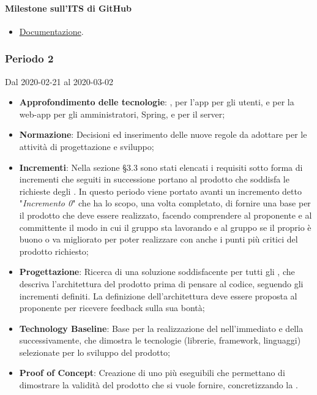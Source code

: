 \paragraph{Milestone sull'ITS di GitHub}
\begin{itemize}
	\item \href{https://github.com/qb-team/Stalker-Documentazione/milestone/8}{Documentazione}.
\end{itemize}

\subsubsection{Periodo 2} 
Dal 2020-02-21 al 2020-03-02
\begin{itemize}
	\item \textbf{Approfondimento delle tecnologie}: ,  per l'app per gli utenti,  e  per la web-app per gli amministratori, Spring,  e  per il server;
	\item \textbf{Normazione}: Decisioni ed inserimento delle nuove regole da adottare per le attività di progettazione e sviluppo;
	\item \textbf{Incrementi}: Nella sezione §3.3 sono stati elencati i requisiti sotto forma di incrementi che seguiti in successione portano al prodotto che soddisfa le richieste degli .
	In questo periodo viene portato avanti un incremento detto "\textit{Incremento 0}" che ha lo scopo, una volta completato, di fornire una base per il prodotto che deve essere realizzato, facendo comprendere al proponente e al committente
	il modo in cui il gruppo sta lavorando e al gruppo se il proprio  è buono o va migliorato per poter realizzare con  anche i punti più critici del prodotto richiesto;
	\item \textbf{Progettazione}: Ricerca di una soluzione soddisfacente per tutti gli , che descriva l'architettura del prodotto prima di pensare al codice, seguendo gli incrementi definiti.
	La definizione dell'architettura deve essere proposta al proponente per ricevere feedback sulla sua bontà;
	\item \textbf{Technology Baseline}: Base per la realizzazione del  nell'immediato e della  successivamente, che dimostra le tecnologie (librerie, framework, linguaggi) selezionate per lo sviluppo del prodotto;
	\item \textbf{Proof of Concept}: Creazione di uno più eseguibili che permettano di dimostrare la validità del prodotto che si vuole fornire, concretizzando la .

\end{itemize}
